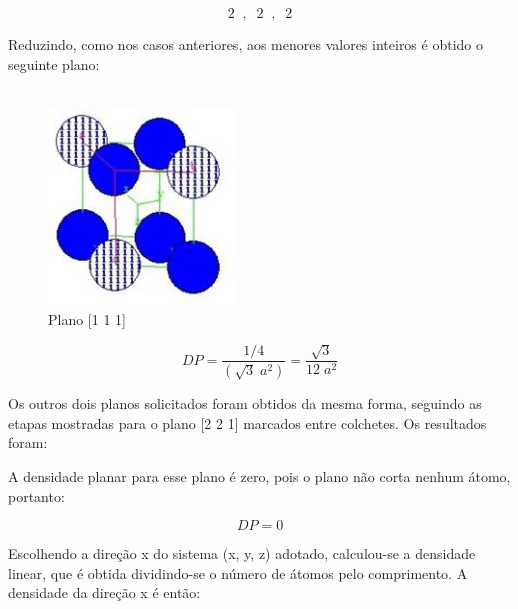 \documentclass[10pt,twocolumn,letterpaper]{article}
\begin{document}
\begin{equation*}
    2 \;\; , \;\; 2 \;\; , \;\; 2
\end{equation*}

\hspace{1cm} Reduzindo, como nos casos anteriores, aos menores valores inteiros é obtido o seguinte plano:

\vspace{-0.5cm}

\begin{align*}
    [ \; 1 \; 1 \; 1 \;]
\end{align*}

\vspace{-0.5cm}

\begin{figure}[h]
    \centering
    \includegraphics[width=5cm]{fig7.jpg}
    \caption{Plano [1 1 1]}
    \label{fig:label}
\end{figure}

\vspace{-0.25cm}

\begin{equation*}
    DP = \frac{1/4}{(\sqrt{3}\;a^2)} = \frac{\sqrt{3}}{12 \; a^2}
\end{equation*}

\hspace{1cm} Os outros dois planos solicitados foram obtidos da mesma forma, seguindo as etapas mostradas para o plano [2 2 1] marcados entre colchetes. Os resultados foram:

\hspace{1cm} A densidade planar para esse plano é zero, pois o plano não corta nenhum átomo, portanto:

\begin{equation*}
    DP = 0
\end{equation*}

Escolhendo a direção x do sistema (x, y, z) adotado, calculou-se a densidade linear, que é obtida dividindo-se o número de átomos pelo comprimento. A densidade da direção x é então:
\end{document}
